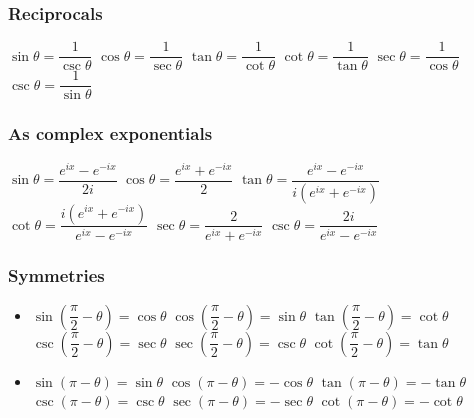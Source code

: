 \subsubsection{Reciprocals}
\begin{itemize}
\itemt \( \sin\theta = \dfrac{1}{\csc\theta} \)
\itemt \( \cos\theta = \dfrac{1}{\sec\theta} \)
\itemt \( \tan\theta = \dfrac{1}{\cot\theta} \)
\itemt \( \cot\theta = \dfrac{1}{\tan\theta} \)
\itemt \( \sec\theta = \dfrac{1}{\cos\theta} \)
\itemt \( \csc\theta = \dfrac{1}{\sin\theta} \)
\end{itemize}

\subsubsection{As complex exponentials}
\begin{itemize}
\itemt \( \sin\theta = \dfrac{e^{ix} - e^{-ix}}{2i} \)
\itemt \( \cos\theta = \dfrac{e^{ix} + e^{-ix}}{2} \)
\itemt \( \tan\theta = \dfrac{e^{ix} - e^{-ix}}{i(e^{ix} + e^{-ix})} \)
\itemt \( \cot\theta = \dfrac{i(e^{ix} + e^{-ix})}{e^{ix} - e^{-ix}} \)
\itemt \( \sec\theta = \dfrac{2}{e^{ix} + e^{-ix}} \)
\itemt \( \csc\theta = \dfrac{2i}{e^{ix} - e^{-ix}} \)
\end{itemize}

\subsubsection{Symmetries}
\begin{itemize}
\itemt \( \sin(-\theta) = -\sin\theta \)
\itemt \( \cos(-\theta) = \cos\theta \)
\itemt \( \tan(-\theta) = -\tan\theta \)
\itemt \( \csc(-\theta) = -\csc\theta \)
\itemt \( \sec(-\theta) = \sec\theta \)
\itemt \( \cot(-\theta) = -\cot\theta \)
\item[]
\itemt \( \sin(\dfrac{\pi}{2} - \theta) = \cos\theta \)
\itemt \( \cos(\dfrac{\pi}{2} - \theta) = \sin\theta \)
\itemt \( \tan(\dfrac{\pi}{2} - \theta) = \cot\theta \)
\itemt \( \csc(\dfrac{\pi}{2} - \theta) = \sec\theta \)
\itemt \( \sec(\dfrac{\pi}{2} - \theta) = \csc\theta \)
\itemt \( \cot(\dfrac{\pi}{2} - \theta) = \tan\theta \)
\item[]
\itemt \( \sin(\pi - \theta) = \sin\theta \)
\itemt \( \cos(\pi - \theta) = -\cos\theta \)
\itemt \( \tan(\pi - \theta) = -\tan\theta \)
\itemt \( \csc(\pi - \theta) = \csc\theta \)
\itemt \( \sec(\pi - \theta) = -\sec\theta \)
\itemt \( \cot(\pi - \theta) = -\cot\theta \)
\end{itemize}

